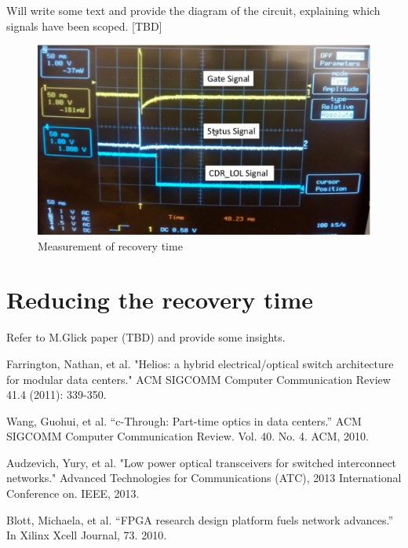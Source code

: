 \documentclass[letterpaper,10pt]{article}
\begin{document}
Will write some text and provide the diagram of the circuit, explaining which signals have been scoped. [TBD]
\begin{figure}[htbp]
  \centering
  \includegraphics[width=15.3cm]{cdr}
\caption{Measurement of recovery time}
\end{figure}

\section{Reducing the recovery time}

Refer to M.Glick paper (TBD) and provide some insights.

\begin{thebibliography}{99}


 Farrington, Nathan, et al. "Helios: a hybrid electrical/optical switch architecture for modular data centers." ACM SIGCOMM Computer Communication Review 41.4 (2011): 339-350.

 Wang, Guohui, et al. ``c-Through: Part-time optics in data centers.'' ACM SIGCOMM Computer Communication Review. Vol. 40. No. 4. ACM, 2010.

 Audzevich, Yury, et al. "Low power optical transceivers for switched interconnect networks." Advanced Technologies for Communications (ATC), 2013 International Conference on. IEEE, 2013. 

 Blott, Michaela, et al. ``FPGA research design platform fuels network advances.'' In Xilinx Xcell Journal, 73. 2010.
\end{thebibliography}
\end{document}
